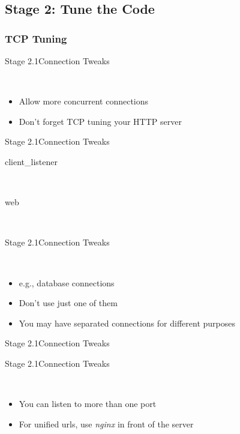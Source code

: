 \documentclass[utf8]{beamer}
\begin{document}
\subsection{Stage 2: Tune the Code}
\subsubsection{TCP Tuning}
\begin{frame}{Stage 2.1}{Connection Tweaks}
	\begin{description}
		\item<+->[Backlog]\ \\
			\begin{itemize}
				\item Allow more concurrent connections
				\item Don't forget TCP tuning your HTTP server
			\end{itemize}
	\end{description}
\end{frame}
\begin{frame}{Stage 2.1}{Connection Tweaks}
	\begin{description}
		\item[client\_listener]~\\\backlog
		\item[web]~\\\backlogweb
	\end{description}
\end{frame}
\begin{frame}{Stage 2.1}{Connection Tweaks}
	\begin{description}
		\item<+->[Outbound Connections]\ \\
			\begin{itemize}
				\item e.g., database connections
				\item Don't use just one of them
				\item You may have separated connections for different purposes
			\end{itemize}
	\end{description}
\end{frame}
\begin{frame}{Stage 2.1}{Connection Tweaks}
\end{frame}
\begin{frame}{Stage 2.1}{Connection Tweaks}
	\begin{description}
		\item<+->[Listeners]\ \\
			\begin{itemize}
				\item You can listen to more than one port
				\item For unified urls, use \emph{nginx} in front of the server
			\end{itemize}
	\end{description}
\end{frame}
\end{document}
